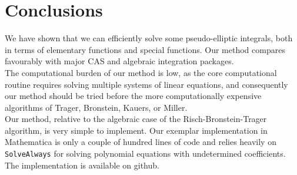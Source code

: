 \documentclass[12pt]{article}
\numberwithin{equation}{section}
\theoremstyle{definition}
\begin{document}
\section{Conclusions}

We have shown that we can efficiently solve some pseudo-elliptic integrals, both in terms of 
elementary functions and special functions. Our method compares favourably with 
major CAS and algebraic integration packages.  \\

The computational burden of our method is low, as the core computational routine requires 
solving multiple systems of linear equations, and consequently our method should be tried before the 
more computationally expensive algorithms of Trager\cite{Trager1984}, Bronstein\cite{Bronstein1990}, 
Kauers\cite{Kauers2008}, or Miller\cite{Miller2012}.\\

Our method, relative to the algebraic case of the Risch-Bronstein-Trager algorithm, is very simple to 
implement. Our exemplar implementation in Mathematica is only a couple of hundred lines of code and 
relies heavily on \texttt{SolveAlways} for solving polynomial equations with undetermined coefficients. 
The implementation is available on github\cite{algebraic_github}. 


\end{document}
